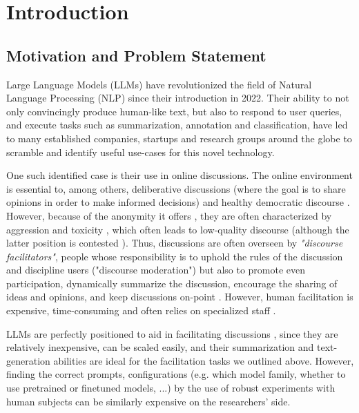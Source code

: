 %
\chapter{Introduction}
\label{sec:intro}

\section{Motivation and Problem Statement}
\label{sec:intro:motivation}

Large Language Models (LLMs) have revolutionized the field of Natural Language Processing (NLP) since their introduction in 2022. Their ability to not only convincingly produce human-like text, but also to respond to user queries, and execute tasks such as summarization, annotation and classification, have led to many established companies, startups and research groups around the globe to scramble and identify useful use-cases for this novel technology.

One such identified case is their use in online discussions. The online environment is essential to, among others, deliberative discussions \cite{small2021polis} (where the goal is to share opinions in order to make informed decisions) and healthy democratic discourse \cite{WrightDemocracy, Janssen2005, Papacharissi2004DemocracyOC}. However, because of the anonymity it offers \cite{Avalle2024PersistentIP}, they are often characterized by aggression and toxicity \cite{XiaToxicity}, which often leads to low-quality discourse \cite{WrightDemocracy} (although the latter position is contested \cite{Papacharissi2004DemocracyOC}). Thus, discussions are often overseen by \textit{"discourse facilitators"}, people whose responsibility is to uphold the rules of the discussion and discipline users ("discourse moderation") but also to promote even participation, dynamically summarize the discussion, encourage the sharing of ideas and opinions, and keep discussions on-point \cite{Harvard2024, Wang2008StudentfacilitatorsRI}. However, human facilitation is expensive, time-consuming and often relies on specialized staff \cite{small-polis-llm}.

LLMs are perfectly positioned to aid in facilitating discussions \cite{small-polis-llm}, since they are relatively inexpensive, can be scaled easily, and their summarization and text-generation abilities are ideal for the facilitation tasks we outlined above. However, finding the correct prompts, configurations (e.g. which model family, whether to use pretrained or finetuned models, ...) by the use of robust experiments with human subjects can be similarly expensive on the researchers' side.

